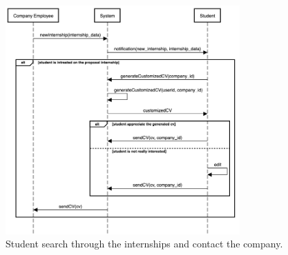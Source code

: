     \begin{figure}[H]
        \centering
        \includegraphics[width=0.8\textwidth]{RASD/Assets/SequenceDiagrams/5-student-receives-a-notification.png}
        \caption{Student search through the internships and contact the company.}
        \label{fig:Student search through the internships and contact the company}
    \end{figure}

